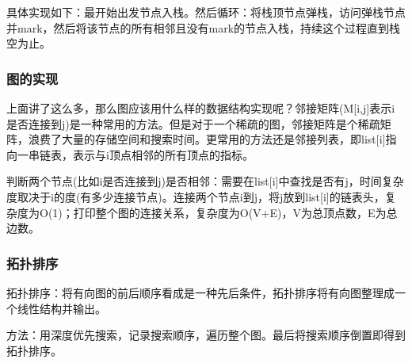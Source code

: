 \documentclass{article}
\begin{document}
	具体实现如下：最开始出发节点入栈。然后循环：将栈顶节点弹栈，访问弹栈节点并mark，然后将该节点的所有相邻且没有mark的节点入栈，持续这个过程直到栈空为止。
	\subsubsection{图的实现}
	上面讲了这么多，那么图应该用什么样的数据结构实现呢？邻接矩阵(M[i,j]表示i是否连接到j)是一种常用的方法。但是对于一个稀疏的图，邻接矩阵是个稀疏矩阵，浪费了大量的存储空间和搜索时间。更常用的方法还是邻接列表，即list[i]指向一串链表，表示与i顶点相邻的所有顶点的指标。
	
	判断两个节点(比如i是否连接到j)是否相邻：需要在list[i]中查找是否有j，时间复杂度取决于i的度(有多少连接节点)。连接两个节点i到j，将j放到list[i]的链表头，复杂度为O(1)；打印整个图的连接关系，复杂度为O(V+E)，V为总顶点数，E为总边数。
	\subsubsection{拓扑排序}
	拓扑排序：将有向图的前后顺序看成是一种先后条件，拓扑排序将有向图整理成一个线性结构并输出。
	
	方法：用深度优先搜索，记录搜索顺序，遍历整个图。最后将搜索顺序倒置即得到拓扑排序。
\end{document}
